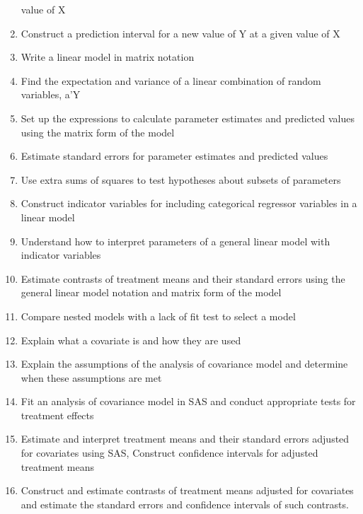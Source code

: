 \documentclass[]{book}
\theoremstyle{definition}
\theoremstyle{definition}
\theoremstyle{definition}
\theoremstyle{remark}
\begin{document}
\begin{enumerate}
  value of X
\item
  Construct a prediction interval for a new value of Y at a given value
  of X
\item
  Write a linear model in matrix notation
\item
  Find the expectation and variance of a linear combination of random
  variables, a'Y
\item
  Set up the expressions to calculate parameter estimates and predicted
  values using the matrix form of the model
\item
  Estimate standard errors for parameter estimates and predicted values
\item
  Use extra sums of squares to test hypotheses about subsets of
  parameters
\item
  Construct indicator variables for including categorical regressor
  variables in a linear model
\item
  Understand how to interpret parameters of a general linear model with
  indicator variables
\item
  Estimate contrasts of treatment means and their standard errors using
  the general linear model notation and matrix form of the model
\item
  Compare nested models with a lack of fit test to select a model
\item
  Explain what a covariate is and how they are used
\item
  Explain the assumptions of the analysis of covariance model and
  determine when these assumptions are met
\item
  Fit an analysis of covariance model in SAS and conduct appropriate
  tests for treatment effects
\item
  Estimate and interpret treatment means and their standard errors
  adjusted for covariates using SAS, Construct confidence intervals for
  adjusted treatment means
\item
  Construct and estimate contrasts of treatment means adjusted for
  covariates and estimate the standard errors and confidence intervals
  of such contrasts.
\end{enumerate}
\end{document}
